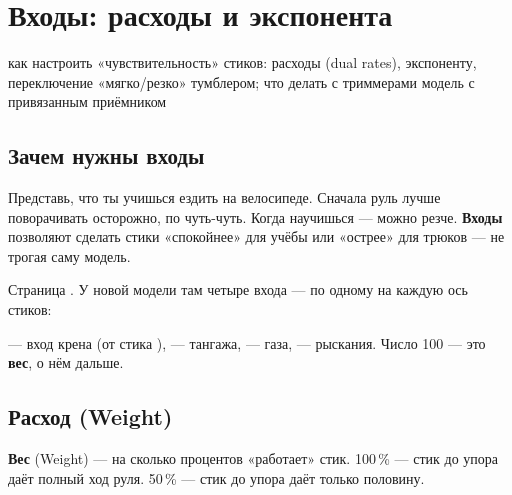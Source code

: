 \chapter{Входы: расходы и экспонента}
\label{ch:inputs}
\chapterintro
  {как настроить «чувствительность» стиков: расходы (dual rates), экспоненту,
   переключение «мягко/резко» тумблером; что делать с триммерами}
  {модель с привязанным приёмником}

\section{Зачем нужны входы}

\begin{simple}
Представь, что ты учишься ездить на велосипеде. Сначала руль лучше поворачивать осторожно,
по чуть-чуть. Когда научишься --- можно резче. \textbf{Входы} позволяют сделать стики
«спокойнее» для учёбы или «острее» для трюков --- не трогая саму модель.
\end{simple}

Страница . У новой модели там четыре входа --- по одному на каждую ось
стиков:

\begin{center}
\end{center}

 --- вход крена (от стика ),  --- тангажа,  --- газа,
 --- рыскания. Число 100 --- это \textbf{вес}, о нём дальше.

\section{Расход (Weight)}

\textbf{Вес} (Weight) --- на сколько процентов «работает» стик. 100\,\% --- стик до упора даёт
полный ход руля. 50\,\% --- стик до упора даёт только половину.

